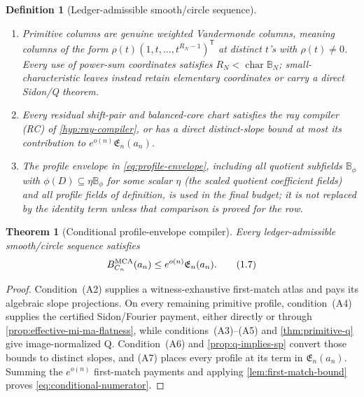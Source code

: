 \documentclass[12pt,a4paper]{amsart}
\numberwithin{equation}{section}
\newtheorem{theorem}{Theorem}[section]
\newtheorem{definition}[definition]{Definition}
\theoremstyle{remark}
\newcommand{\B}{\mathbb B}
\begin{document}
\begin{definition}[Ledger-admissible smooth/circle sequence]
\begin{enumerate}[label=\textup{(A\arabic*)},leftmargin=*]
      the range where its numerical inequality and all certified-lift
      hypotheses are verified.
\item Primitive columns are genuine weighted Vandermonde columns, meaning
      columns of the form
      \(\rho(t)(1,t,\ldots,t^{R_N-1})^{\mathsf T}\) at distinct
      \(t\)'s with \(\rho(t)\ne0\).  Every
      use of power-sum coordinates satisfies
      \(R_N<\operatorname{char}\B_N\); small-characteristic leaves instead
      retain elementary coordinates or carry a direct Sidon/Q theorem.
\item Every residual shift-pair and balanced-core chart satisfies the ray
      compiler \textup{(RC)} of \cref{hyp:ray-compiler}, or has a direct
      distinct-slope bound at most its contribution to
      \(e^{o(n)}\mathfrak E_n(a_n)\).
\item The profile envelope in \eqref{eq:profile-envelope}, including all
      quotient subfields \(\B_\phi\) with
      \(\phi(D)\subseteq\eta\B_\phi\) for some scalar \(\eta\)
      (the \emph{scaled quotient coefficient fields}) and all profile fields of
      definition, is used in
      the final budget; it is not replaced by the identity term unless that
      comparison is proved for the row.
\end{enumerate}
\end{definition}

\begin{theorem}[Conditional profile-envelope compiler]
\label{thm:main-smooth-circle}
Every ledger-admissible smooth/circle sequence satisfies
\[
        B_{C_n}^{\rm MCA}(a_n)
        \le e^{o(n)}\mathfrak E_n(a_n).
        \tag{1.7}\label{eq:conditional-numerator}
\]
\end{theorem}

\begin{proof}
Condition~\textup{(A2)} supplies a witness-exhaustive first-match atlas
and pays its algebraic slope projections.  On every remaining primitive
profile, condition~\textup{(A4)} supplies the certified Sidon/Fourier
payment, either directly or through
\cref{prop:effective-mi-ma-flatness}, while conditions~\textup{(A3)}--\textup{(A5)} and
\cref{thm:primitive-q} give image-normalized Q.  Condition~\textup{(A6)}
and \cref{prop:q-implies-sp} convert those bounds to distinct slopes, and
\textup{(A7)} places every profile at its term in
\(\mathfrak E_n(a_n)\).  Summing the \(e^{o(n)}\) first-match payments and
applying \cref{lem:first-match-bound} proves
\eqref{eq:conditional-numerator}.
\end{proof}
\end{document}
